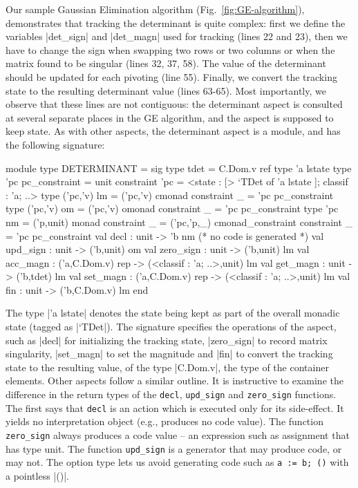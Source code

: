 \documentclass{elsart}
\newcommand{\oleg}[1]{{\it [Oleg says: #1]}}
\newcommand{\jacques}[1]{{\it [Jacques says: #1]}}
\begin{document}
Our sample Gaussian Elimination algorithm (Fig.~\ref{fig:GE-algorithm}),
demonstrates that tracking the determinant is quite complex: first we define
the variables |det_sign| and |det_magn| used for tracking (lines 22 and
23), then we have to change the sign when swapping two rows or two
columns or when the matrix found to be singular (lines 32, 37, 58).
The value of the determinant should be updated for each pivoting (line
55). Finally, we convert the tracking state to the resulting
determinant value (lines 63-65). Most importantly, we observe that these lines
are not contiguous: the determinant aspect is consulted at several separate
places in the GE algorithm, and the aspect is supposed to keep
state. As with other aspects, the determinant aspect is a module,
and has the following signature:
\begin{code}
module type DETERMINANT = sig
  type tdet = C.Dom.v ref
  type 'a lstate
  type 'pc pc_constraint = unit
    constraint 'pc = <state : [> `TDet of 'a lstate ]; classif : 'a; ..>
  type ('pc,'v) lm = ('pc,'v) cmonad
    constraint _  = 'pc pc_constraint
  type ('pc,'v) om = ('pc,'v) omonad
    constraint _  = 'pc pc_constraint
  type 'pc nm = ('p,unit) monad
    constraint _ = ('pc,'p,_) cmonad_constraint
    constraint _ = 'pc pc_constraint
  val decl : unit -> 'b nm (* no code is generated *)
  val upd_sign  : unit -> ('b,unit) om
  val zero_sign : unit -> ('b,unit) lm
  val acc_magn  : ('a,C.Dom.v) rep -> (<classif : 'a; ..>,unit) lm
  val get_magn  : unit -> ('b,tdet) lm
  val set_magn  : ('a,C.Dom.v) rep -> (<classif : 'a; ..>,unit) lm
  val fin       : unit -> ('b,C.Dom.v) lm
end
\end{code}
The type |'a lstate| denotes the state being kept as part of the
overall monadic state (tagged as |`TDet|). The signature specifies the
operations of the aspect, such as |decl| for initializing the tracking
state, |zero_sign| to record matrix singularity, |set_magn| to set the
magnitude and |fin| to convert the tracking state to the resulting
value, of  the type |C.Dom.v|, the type of the container
elements. Other aspects follow a similar outline.
It is instructive to examine the difference in the return types of the
\texttt{decl}, \texttt{upd\_sign} and \texttt{zero\_sign} functions. The first
says that \texttt{decl} is an action which is executed only for its
side-effect. It yields no interpretation object (e.g., produces no
code value). The function \texttt{zero\_sign} always produces a code
value -- an expression such as assignment that has type unit. 
The function \texttt{upd\_sign} is a generator that may produce code, or may
not. The option type lets us avoid generating code such as 
\texttt{a := b; ()} with a pointless |()|.
\end{document}
